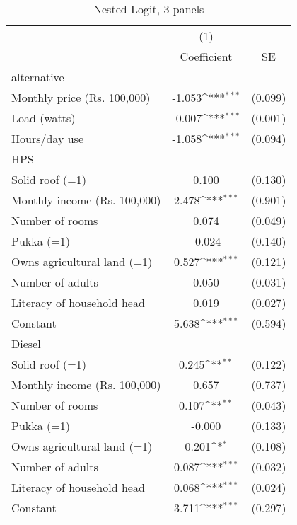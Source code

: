 \begin{table}[htbp]\centering
\def\sym#1{\ifmmode^{#1}\else\(^{#1}\)\fi}
\caption{Nested Logit, 3 panels}
\begin{tabular}{l*{1}{cc}}
\toprule
                    &\multicolumn{1}{c}{(1)}         &            \\
                    & Coefficient         &          SE\\
\midrule
alternative         &                     &            \\
Monthly price (Rs. 100,000)&      -1.053\sym{***}&     (0.099)\\
Load (watts)        &      -0.007\sym{***}&     (0.001)\\
Hours/day use       &      -1.058\sym{***}&     (0.094)\\
\midrule
HPS                &                     &            \\
Solid roof (=1)     &       0.100         &     (0.130)\\
Monthly income (Rs. 100,000)&       2.478\sym{***}&     (0.901)\\
Number of rooms     &       0.074         &     (0.049)\\
Pukka (=1)          &      -0.024         &     (0.140)\\
Owns agricultural land (=1)&       0.527\sym{***}&     (0.121)\\
Number of adults    &       0.050         &     (0.031)\\
Literacy of household head&       0.019         &     (0.027)\\
Constant            &       5.638\sym{***}&     (0.594)\\
\midrule
Diesel             &                     &            \\
Solid roof (=1)     &       0.245\sym{**} &     (0.122)\\
Monthly income (Rs. 100,000)&       0.657         &     (0.737)\\
Number of rooms     &       0.107\sym{**} &     (0.043)\\
Pukka (=1)          &      -0.000         &     (0.133)\\
Owns agricultural land (=1)&       0.201\sym{*}  &     (0.108)\\
Number of adults    &       0.087\sym{***}&     (0.032)\\
Literacy of household head&       0.068\sym{***}&     (0.024)\\
Constant            &       3.711\sym{***}&     (0.297)\\

\end{tabular}
\end{table}
